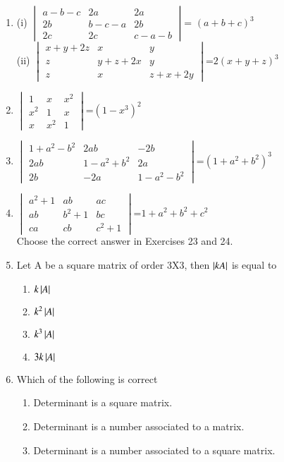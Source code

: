 \begin{enumerate}[label=\arabic*.,ref=\thesubsection.\theenumi]
(ii) $\begin{vmatrix}y+k&y&y \\ y&y+k&y \\ y&y&xy+k\end{vmatrix}$=$k^2(3y+k)$
\item (i) $\begin{vmatrix}a-b-c& 2a& 2a \\ 2b& b-c-a& 2b \\ 2c& 2c& c-a-b\end{vmatrix}$= $(a+b+c)^3$\\
(ii) $\begin{vmatrix}x+y+2z&x&y \\ z&y+z+2x&y \\ z&x&z+x+2y\end{vmatrix}$=$2(x+y+z)^3$
\item $\begin{vmatrix}1&x&x^2 \\ x^2&1&x \\ x&x^2&1\end{vmatrix}$=$(1-x^3)^2$ 
\item $\begin{vmatrix}1+a^2-b^2&2ab&-2b \\ 2ab&1-a^2+b^2&2a \\ 2b&-2a&1-a^2-b^2\end{vmatrix}$=$(1+a^2+b^2)^3$
\item $\begin{vmatrix}a^2+1&ab&ac \\ ab&b^2+1&bc \\ ca&cb&c^2+1\end{vmatrix}$=$1+a^2+b^2+c^2$\\
Choose the correct answer in Exercises 23 and 24.
\item Let A be a square matrix of order 3X3, then 
$\left\vert kA\right\vert$ is equal to
\begin{enumerate}
\item $k\left\vert A\right\vert$
\item $k^2\left\vert A\right\vert$
\item $k^3\left\vert A\right\vert$
\item $3k\left\vert A\right\vert$
\end{enumerate} 
\item Which of the following is correct
\begin{enumerate}
\item Determinant is a square matrix.
\item Determinant is a number associated to a matrix.
\item Determinant is a number associated to a square matrix.

\end{enumerate}
\end{enumerate}
